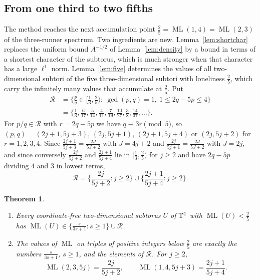\documentclass[12pt]{amsart}
\newtheorem{theorem}{Theorem}[section]
\theoremstyle{definition}\newtheorem{definition}[theorem]{Definition}
\theoremstyle{remark}\newtheorem{remark}[theorem]{Remark}
\newcommand{\ML}{\operatorname{ML}}
\begin{document}
\subsection{From one third to two fifths}\label{sec:upto25}
The method reaches the next accumulation point $\frac25=\ML(1,4)=\ML(2,3)$ of the three-runner spectrum. Two ingredients are new. Lemma~\ref{lem:shortchar} replaces the uniform bound $A^{-1/2}$ of Lemma~\ref{lem:density} by a bound in terms of a shortest character of the subtorus, which is much stronger when that character has a large $\ell^1$ norm. Lemma~\ref{lem:five} determines the values of all two-dimensional subtori of the five three-dimensional subtori with loneliness $\frac25$, which carry the infinitely many values that accumulate at $\frac25$. Put
\begin{align*}
 \mathcal R&=\Big\{\frac pq\in\Big[\frac13,\frac25\Big):\ \gcd(p,q)=1,\ 1\le 2q-5p\le 4\Big\}\\
 &=\Big\{\frac13,\frac6{17},\frac5{14},\frac4{11},\frac7{19},\frac{10}{27},\frac38,\frac{14}{37},\dots\Big\}.
\end{align*}
For $p/q\in\mathcal R$ with $r=2q-5p$ we have $q\equiv3r\pmod5$, so $(p,q)=(2j+1,5j+3)$, $(2j,5j+1)$, $(2j+1,5j+4)$ or $(2j,5j+2)$ for $r=1,2,3,4$. Since $\frac{2j+1}{5j+3}=\frac{2J}{5J+2}$ with $J=4j+2$ and $\frac{2j}{5j+1}=\frac{2J}{5J+2}$ with $J=2j$, and since conversely $\frac{2j}{5j+2}$ and $\frac{2j+1}{5j+4}$ lie in $[\frac13,\frac25)$ for $j\ge2$ and have $2q-5p$ dividing $4$ and $3$ in lowest terms,
\begin{equation}\label{eq:R}
 \mathcal R=\Big\{\frac{2j}{5j+2}:j\ge2\Big\}\cup\Big\{\frac{2j+1}{5j+4}:j\ge2\Big\}.
\end{equation}

\begin{theorem}\label{thm:upto25}
\begin{enumerate}[label=\textup{(\roman*)},leftmargin=*]
\item Every coordinate-free two-dimensional subtorus $U$ of $\mathbb T^4$ with $\ML(U)<\frac25$ has $\ML(U)\in\{\frac s{3s+1}:s\ge1\}\cup\mathcal R$.
\item The values of $\ML$ on triples of positive integers below $\frac25$ are exactly the numbers $\frac s{3s+1}$, $s\ge1$, and the elements of $\mathcal R$. For $j\ge2$,
\[
 \ML(2,3,5j)=\frac{2j}{5j+2},\qquad \ML(1,4,5j+3)=\frac{2j+1}{5j+4}.
\]
\end{enumerate}
\end{theorem}
\end{document}
